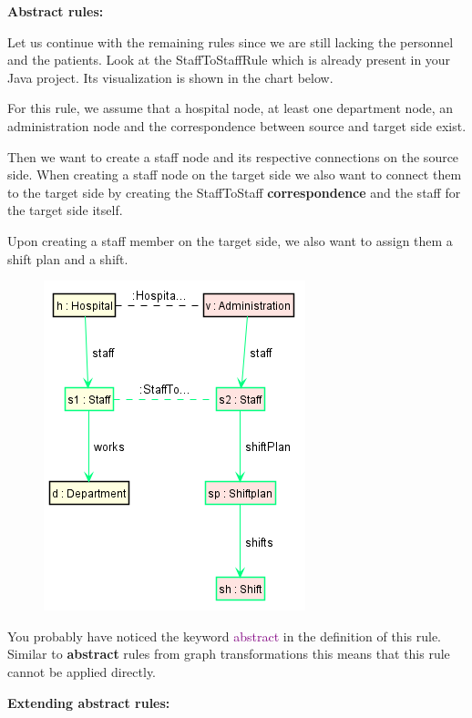 {\clearpage

\textbf{Abstract rules:}

Let us continue with the remaining rules since we are still lacking the personnel and the patients. Look at the \textsf{StaffToStaffRule} which is already present in your Java project. Its visualization is shown in the chart below.

For this rule, we assume that a hospital node, at least one department node, an administration node and the correspondence between source and target side exist.

Then we want to create a staff node and its respective connections on the source side. When creating a staff node on the target side we also want to connect them to the target side by creating the \textsf{StaffToStaff} \textbf{correspondence} and the staff for the target side itself.

Upon creating a staff member on the target side, we also want to assign them a shift plan and a shift.

\begin{figure}[h]
    \centering
    \includegraphics[scale=0.6 ]{pictures/StaffToStaffRule.png}
    \caption{}
    \label{TGG rule creation}
\end{figure}

You probably have noticed the keyword \textcolor{Purple}{abstract} in the definition of this rule. Similar to \textbf{abstract} rules from graph transformations this means that this rule cannot be applied directly.\newline

\textbf{Extending abstract rules:}

}
